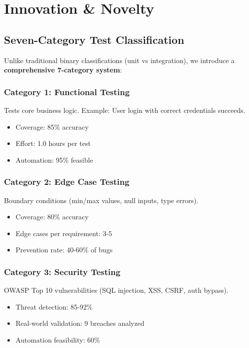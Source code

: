 \documentclass[12pt,oneside]{report}
\begin{document}
\chapter{Innovation \& Novelty}

\section{Seven-Category Test Classification}

Unlike traditional binary classifications (unit vs integration), we introduce 
a \textbf{comprehensive 7-category system}:

\subsection{Category 1: Functional Testing}
Tests core business logic. Example: User login with correct credentials succeeds.
\begin{itemize}
    \item Coverage: 85\% accuracy
    \item Effort: 1.0 hours per test
    \item Automation: 95\% feasible
\end{itemize}

\subsection{Category 2: Edge Case Testing}
Boundary conditions (min/max values, null inputs, type errors).
\begin{itemize}
    \item Coverage: 80\% accuracy
    \item Edge cases per requirement: 3-5
    \item Prevention rate: 40-60\% of bugs
\end{itemize}

\subsection{Category 3: Security Testing}
OWASP Top 10 vulnerabilities (SQL injection, XSS, CSRF, auth bypass).
\begin{itemize}
    \item Threat detection: 85-92\%
    \item Real-world validation: 9 breaches analyzed
    \item Automation feasibility: 60\%
\end{itemize}
\end{document}
